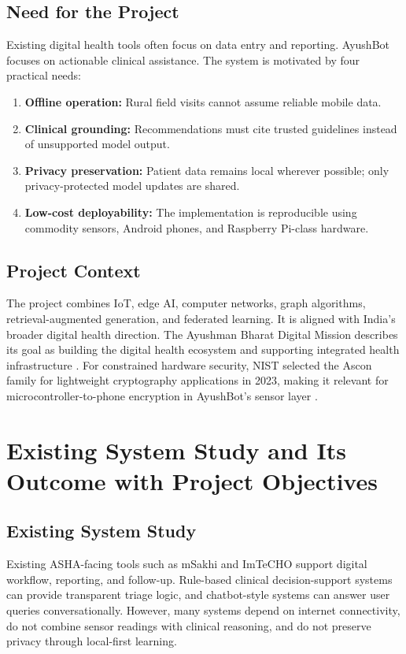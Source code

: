 \documentclass[12pt,a4paper,openany]{report}
\begin{document}
\section{Need for the Project}
Existing digital health tools often focus on data entry and reporting. AyushBot focuses on actionable clinical assistance. The system is motivated by four practical needs:
\begin{enumerate}
  \item \textbf{Offline operation:} Rural field visits cannot assume reliable mobile data.
  \item \textbf{Clinical grounding:} Recommendations must cite trusted guidelines instead of unsupported model output.
  \item \textbf{Privacy preservation:} Patient data remains local wherever possible; only privacy-protected model updates are shared.
  \item \textbf{Low-cost deployability:} The implementation is reproducible using commodity sensors, Android phones, and Raspberry Pi-class hardware.
\end{enumerate}

\section{Project Context}
The project combines IoT, edge AI, computer networks, graph algorithms, retrieval-augmented generation, and federated learning. It is aligned with India's broader digital health direction. The Ayushman Bharat Digital Mission describes its goal as building the digital health ecosystem and supporting integrated health infrastructure \cite{abdm}. For constrained hardware security, NIST selected the Ascon family for lightweight cryptography applications in 2023, making it relevant for microcontroller-to-phone encryption in AyushBot's sensor layer \cite{nistascon}.

\chapter{Existing System Study and Its Outcome with Project Objectives}

\section{Existing System Study}
Existing ASHA-facing tools such as mSakhi and ImTeCHO support digital workflow, reporting, and follow-up. Rule-based clinical decision-support systems can provide transparent triage logic, and chatbot-style systems can answer user queries conversationally. However, many systems depend on internet connectivity, do not combine sensor readings with clinical reasoning, and do not preserve privacy through local-first learning.
\end{document}
